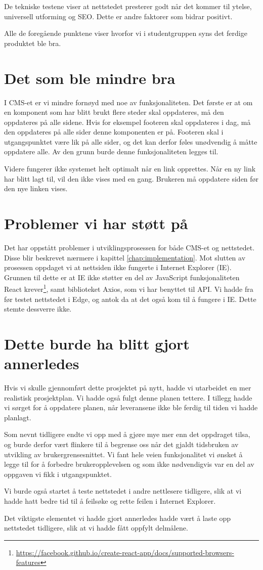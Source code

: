 De tekniske testene viser at nettstedet presterer godt når det kommer til ytelse, universell utforming og SEO. Dette er andre faktorer som bidrar positivt.

Alle de foregående punktene viser hvorfor vi i studentgruppen syns det ferdige produktet ble bra.

\section{Det som ble mindre bra}
I CMS-et er vi mindre fornøyd med noe av funksjonaliteten. Det første er at om en komponent som har blitt brukt flere steder skal oppdateres, må den oppdateres på alle sidene. Hvis for eksempel footeren skal oppdateres i dag, må den oppdateres på alle sider denne komponenten er på. Footeren skal i utgangspunktet være lik på alle sider, og det kan derfor føles unødvendig å måtte oppdatere alle. Av den grunn burde denne funksjonaliteten legges til.

Videre fungerer ikke systemet helt optimalt når en link opprettes. Når en ny link har blitt lagt til, vil den ikke vises med en gang. Brukeren må oppdatere siden før den nye linken vises.

\section{Problemer vi har støtt på}
Det har oppstått problemer i utviklingsprosessen for både CMS-et og nettstedet. Disse blir beskrevet nærmere i kapittel \ref{chap:implementation}. Mot slutten av prosessen oppdaget vi at nettsiden ikke fungerte i Internet Explorer (IE). Grunnen til dette er at IE ikke støtter en del av JavaScript funksjonaliteten React krever\footnote{\url{https://facebook.github.io/create-react-app/docs/supported-browsers-features}}, samt biblioteket Axios, som vi har benyttet til API. Vi hadde fra før testet nettstedet i Edge, og antok da at det også kom til å fungere i IE. Dette stemte dessverre ikke.

\section{Dette burde ha blitt gjort annerledes}
Hvis vi skulle gjennomført dette prosjektet på nytt, hadde vi utarbeidet en mer realistisk prosjektplan. Vi hadde også fulgt denne planen tettere. I tillegg hadde vi sørget for å oppdatere planen, når leveransene ikke ble ferdig til tiden vi hadde planlagt.

Som nevnt tidligere endte vi opp med å gjøre mye mer enn det oppdraget tilsa, og burde derfor vært flinkere til å begrense oss når det gjaldt tidsbruken av utvikling av brukergrensesnittet. Vi fant hele veien funksjonalitet vi ønsket å legge til for å forbedre brukeropplevelsen og som ikke nødvendigvis var en del av oppgaven vi fikk i utgangspunktet. 

Vi burde også startet å teste nettstedet i andre nettlesere tidligere, slik at vi hadde hatt bedre tid til å feilsøke og rette feilen i Internet Explorer.

Det viktigste elementet vi hadde gjort annerledes hadde vært å laste opp nettstedet tidligere, slik at vi hadde fått oppfylt delmålene. 
